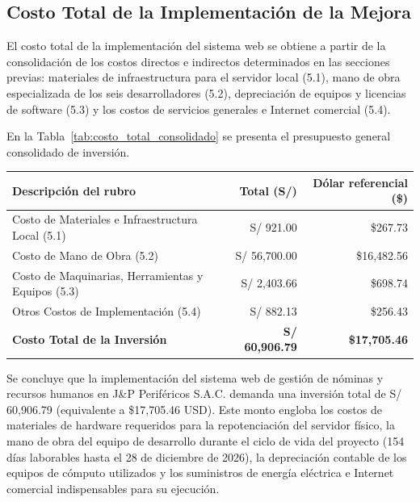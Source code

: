 \subsection{Costo Total de la Implementación de la Mejora}

El costo total de la implementación del sistema web se obtiene a partir de la consolidación de los costos directos e 
indirectos determinados en las secciones previas: materiales de infraestructura para el servidor local (5.1), 
mano de obra especializada de los seis desarrolladores (5.2), 
depreciación de equipos y licencias de software (5.3) y 
los costos de servicios generales e Internet comercial (5.4).

En la Tabla~\ref{tab:costo_total_consolidado} se presenta el presupuesto general consolidado de inversión.

\par
\noindent
\begin{minipage}{\linewidth}

    \begingroup
    \renewcommand{\baselinestretch}{1}
    \footnotesize
    \setlength{\tabcolsep}{4pt}
    \renewcommand{\arraystretch}{1.25}

    \begin{tabularx}{\linewidth}{@{}p{6.8cm}r r@{}}
        \toprule
        \textbf{Descripción del rubro} & \textbf{Total (S/)} & \textbf{Dólar referencial (\$)} \\ \midrule
        Costo de Materiales e Infraestructura Local (5.1) & S/ 921.00 & \$267.73 \\ 
        Costo de Mano de Obra (5.2) & S/ 56,700.00 & \$16,482.56 \\ 
        Costo de Maquinarias, Herramientas y Equipos (5.3) & S/ 2,403.66 & \$698.74 \\ 
        Otros Costos de Implementación (5.4) & S/ 882.13 & \$256.43 \\ \midrule
        \textbf{Costo Total de la Inversión} & \textbf{S/ 60,906.79} & \textbf{\$17,705.46} \\ \bottomrule
    \end{tabularx}
    \endgroup

\end{minipage}
\finBloqueAPA

Se concluye que la implementación del sistema web de gestión de nóminas y recursos humanos en J\&P Periféricos S.A.C. 
demanda una inversión total de S/ 60,906.79 (equivalente a \$17,705.46 USD). 
Este monto engloba los costos de materiales de hardware requeridos para la repotenciación del servidor físico,
la mano de obra del equipo de desarrollo durante el ciclo de vida del proyecto (154 días laborables hasta el 28 de diciembre de 2026), 
la depreciación contable de los equipos de cómputo utilizados y los suministros de energía eléctrica e Internet comercial indispensables para su ejecución.